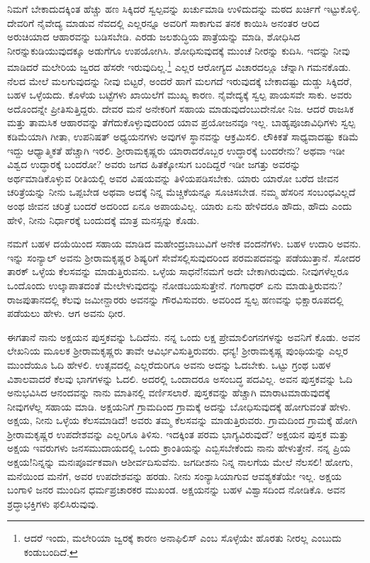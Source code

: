 ನಿಮಗೆ ಬೇಕಾದುದಕ್ಕಿಂತ ಹೆಚ್ಚು ಹಣ ಸಿಕ್ಕಿದರೆ ಸ್ವಲ್ಪವನ್ನು ಖರ್ಚುಮಾಡಿ ಉಳಿದುದನ್ನು ಮಠದ ಖರ್ಚಿಗೆ ಇಟ್ಟುಕೊಳ್ಳಿ. ದೇವರಿಗೆ ನೈವೇದ್ಯ ಮಾಡುವ ನೆವದಲ್ಲಿ ಎಲ್ಲರನ್ನೂ ಅವರಿಗೆ ಸಾಕಾಗುವ ತನಕ ಕಾಯಿಸಿ ಅನಂತರ ಆರಿದ ಅರುಚಿಯಾದ ಆಹಾರವನ್ನು ಬಡಿಸಬೇಡಿ. ಎರಡು ಜಲಶುದ್ಧಿಯ ಪಾತ್ರೆಯನ್ನು ಮಾಡಿ, ಶೋಧಿಸಿದ ನೀರನ್ನು\break ಕುಡಿಯುವುದಕ್ಕೂ ಅಡುಗೆಗೂ ಉಪಯೋಗಿಸಿ. ಶೋಧಿಸುವುದಕ್ಕೆ ಮುಂಚೆ ನೀರನ್ನು ಕುದಿಸಿ. ಇದನ್ನು ನೀವು ಮಾಡಿದರೆ ಮಲೇರಿಯ ಜ್ವರದ ಹೆಸರೇ ಇರುವುದಿಲ್ಲ.\footnote{ಆದರೆ ಇಂದು, ಮಲೇರಿಯಾ ಜ್ವರಕ್ಕೆ ಕಾರಣ ಅನಾಫಿಲಿಸ್ ಎಂಬ ಸೊಳ್ಳೆಯೇ ಹೊರತು ನೀರಲ್ಲ ಎಂಬುದು ಕಂಡುಬಂದಿದೆ.} ಎಲ್ಲರ ಆರೋಗ್ಯದ ವಿಚಾರದಲ್ಲೂ ಚೆನ್ನಾಗಿ ಗಮನಕೊಡು. ನೆಲದ ಮೇಲೆ ಮಲಗುವುದನ್ನು ನೀವು ಬಿಟ್ಟರೆ, ಅಂದರೆ ಹಾಗೆ ಮಲಗದೆ ಇರುವುದಕ್ಕೆ ಬೇಕಾದಷ್ಟು ದುಡ್ಡು ಸಿಕ್ಕಿದರೆ, ಬಹಳ ಒಳ್ಳೆಯದು. ಕೊಳೆಯ ಬಟ್ಟೆಗಳು ಖಾಯಿಲೆಗೆ ಮುಖ್ಯ ಕಾರಣ. ನೈವೇದ್ಯಕ್ಕೆ ಸ್ವಲ್ಪ ಪಾಯಸವೇ ಸಾಕು. ಅವರು ಅದೊಂದನ್ನೇ ಪ್ರೀತಿಸುತ್ತಿದ್ದರು. ದೇವರ ಮನೆ ಅನೇಕರಿಗೆ ಸಹಾಯ ಮಾಡುವುದೆಂಬುದೇನೋ ನಿಜ. ಆದರೆ ರಾಜಸಿಕ ಮತ್ತು ತಾಮಸಿಕ ಆಹಾರವನ್ನು ತೆಗೆದುಕೊಳ್ಳುವುದರಿಂದ ಯಾವ ಪ್ರಯೋಜನವೂ ಇಲ್ಲ. ಬಾಹ್ಯಪೂಜಾವಿಧಿಗಳು ಸ್ವಲ್ಪ ಕಡಿಮೆಯಾಗಿ ಗೀತಾ, ಉಪನಿಷತ್ ಅಧ್ಯಯನಗಳು ಅವುಗಳ ಸ್ಥಾನವನ್ನು ಆಕ್ರಮಿಸಲಿ. ಲೌಕಿಕತೆ ಸಾಧ್ಯವಾದಷ್ಟು ಕಡಿಮೆ ಇದ್ದು ಆಧ್ಯಾತ್ಮಿಕತೆ ಹೆಚ್ಚಾಗಿ ಇರಲಿ. ಶ‍್ರೀರಾಮಕೃಷ್ಣರು ಯಾರಾದರೊಬ್ಬರ ಉದ್ಧಾರಕ್ಕೆ ಬಂದರೇನು? ಅಥವಾ ಇಡೀ ವಿಶ್ವದ ಉದ್ಧಾರಕ್ಕೆ ಬಂದರೋ? ಅವರು ಜಗದ ಹಿತಕ್ಕೋಸುಗ ಬಂದಿದ್ದರೆ ಇಡೀ ಜಗತ್ತು ಅವರನ್ನು ಅರ್ಥಮಾಡಿಕೊಳ್ಳುವ ರೀತಿಯಲ್ಲಿ ಅವರ ವಿಷಯವನ್ನು ತಿಳಿಯಪಡಿಸಬೇಕು. ಯಾರು ಯಾರೋ ಬರೆದ ಜೀವನ ಚರಿತ್ರೆಯನ್ನು ನೀನು ಒಪ್ಪಬೇಡ ಅಥವಾ ಅದಕ್ಕೆ ನಿನ್ನ ಮೆಚ್ಚಿಕೆಯನ್ನೂ ಸೂಚಿಸಬೇಡ. ನಮ್ಮ ಹೆಸರಿನ ಸಂಬಂಧವಿಲ್ಲದೆ ಅಂಥ ಜೀವನ ಚರಿತ್ರೆ ಬಂದರೆ ಅದರಿಂದ ಏನೂ ಅಪಾಯವಿಲ್ಲ. ಯಾರು ಏನು ಹೇಳಿದರೂ ಹೌದು, ಹೌದು ಎಂದು ಹೇಳಿ, ನೀನು ನಿರ್ಧಾರಕ್ಕೆ ಬಂದುದಕ್ಕೆ ಮಾತ್ರ ಮನಸ್ಸನ್ನು ಕೊಡು.

ನಮಗೆ ಬಹಳ ದಯೆಯಿಂದ ಸಹಾಯ ಮಾಡಿದ ಮಹೇಂದ್ರಬಾಬುವಿಗೆ ಅನೇಕ ವಂದನೆಗಳು. ಬಹಳ ಉದಾರಿ ಅವನು. ಇನ್ನು ಸಂನ್ಯಾಲ್\enginline{-} ಅವನು ಶ‍್ರೀರಾಮಕೃಷ್ಣರ ಶಿಷ್ಯರಿಗೆ ಸೇವೆಸಲ್ಲಿಸುವುದರಿಂದ ಪರಮಪದವನ್ನು ಪಡೆಯುತ್ತಾನೆ. ಸೋದರ ತಾರಕ್ ಒಳ್ಳೆಯ ಕೆಲಸವನ್ನು ಮಾಡುತ್ತಿರುವನು. ಒಳ್ಳೆಯ ಸಾಧನೆ!ನಮಗೆ ಅದೇ ಬೇಕಾಗಿರುವುದು. ನೀವುಗಳೆಲ್ಲರೂ ಒಂದೊಂದು ಉಲ್ಕಾಪಾತದಂತೆ ಮೇಲೇಳುವುದನ್ನು ನೋಡಬಯಸುತ್ತೇನೆ. ಗಂಗಾಧರ್ ಏನು ಮಾಡುತ್ತಿರುವನು? ರಾಜಪುತಾನದಲ್ಲಿ ಕೆಲವು ಜಮೀನ್ದಾರರು ಅವನನ್ನು ಗೌರವಿಸುವರು. ಅವರಿಂದ ಸ್ವಲ್ಪ ಹಣವನ್ನು ಭಿಕ್ಷಾರೂಪದಲ್ಲಿ ಪಡೆಯಲು ಹೇಳು. ಆಗ ಅವನು ಧೀರ.

ಈಗತಾನೆ ನಾನು ಅಕ್ಷಯನ ಪುಸ್ತಕವನ್ನು ಓದಿದೆನು. ನನ್ನ ಒಂದು ಲಕ್ಷ ಪ್ರೇಮಾಲಿಂಗನಗಳನ್ನು ಅವನಿಗೆ ಕೊಡು. ಅವನ ಲೇಖನಿಯ ಮೂಲಕ ಶ‍್ರೀರಾಮಕೃಷ್ಣರು ತಾವೇ ಆವಿರ್ಭವಿಸುತ್ತಿರುವರು. ಧನ್ಯ! ಶ‍್ರೀರಾಮಕೃಷ್ಣ ಪುಂಥಿಯನ್ನು ಎಲ್ಲರ ಮುಂದೆಯೂ ಓದಿ ಹೇಳಲಿ. ಉತ್ಸವದಲ್ಲಿ ಎಲ್ಲರೆದುರಿಗೂ ಅವನು ಅದನ್ನು ಓದಬೇಕು. ಒಟ್ಟು ಗ್ರಂಥ ಬಹಳ ವಿಶಾಲವಾದರೆ ಕೆಲವು ಭಾಗಗಳನ್ನು ಓದಲಿ. ಅದರಲ್ಲಿ ಒಂದಾದರೂ ಅಸಂಬದ್ಧ ಪದವಿಲ್ಲ. ಅವನ ಪುಸ್ತಕವನ್ನು ಓದಿ ಅನುಭವಿಸಿದ ಆನಂದವನ್ನು ನಾನು ಮಾತಿನಲ್ಲಿ ವರ್ಣಿಸಲಾರೆ. ಪುಸ್ತಕವನ್ನು ಹೆಚ್ಚಾಗಿ ಮಾರಾಟಮಾಡುವುದಕ್ಕೆ ನೀವುಗಳೆಲ್ಲ ಸಹಾಯ ಮಾಡಿ. ಅಕ್ಷಯನಿಗೆ ಗ್ರಾಮದಿಂದ ಗ್ರಾಮಕ್ಕೆ ಅದನ್ನು ಬೋಧಿಸುವುದಕ್ಕೆ ಹೋಗುವಂತೆ ಹೇಳು. ಅಕ್ಷಯ, ನೀನು ಒಳ್ಳೆಯ ಕೆಲಸಮಾಡಿದೆ! \enginline{-} ಅವರು ತಮ್ಮ ಕೆಲಸವನ್ನು ಮಾಡುತ್ತಿರುವರು. ಗ್ರಾಮದಿಂದ ಗ್ರಾಮಕ್ಕೆ ಹೋಗಿ ಶ‍್ರೀರಾಮಕೃಷ್ಣರ ಉಪದೇಶವನ್ನು ಎಲ್ಲರಿಗೂ ತಿಳಿಸು. ಇದಕ್ಕಿಂತ ಪರಮ ಭಾಗ್ಯವಿರುವುದೆ? ಅಕ್ಷಯನ ಪುಸ್ತಕ ಮತ್ತು ಅಕ್ಷಯ ಇವರುಗಳು ಜನಸಮುದಾಯದಲ್ಲಿ ಒಂದು ಕ್ರಾಂತಿಯನ್ನು ಎಬ್ಬಿಸಬೇಕೆಂದು ನಾನು ಹೇಳುತ್ತೇನೆ. ನನ್ನ ಪ್ರಿಯ ಅಕ್ಷಯ!ನಿನ್ನನ್ನು ಮನಃಪೂರ್ವಕವಾಗಿ ಆಶೀರ್ವದಿಸುವೆನು. ಜಗದೀಶನು ನಿನ್ನ ನಾಲಗೆಯ ಮೇಲೆ ನೆಲಸಲಿ! ಹೋಗು, ಮನೆಯಿಂದ ಮನೆಗೆ, ಅವರ ಉಪದೇಶವನ್ನು ಹರಡು. ನೀನು ಸಂನ್ಯಾಸಿಯಾಗುವ ಆವಶ್ಯಕತೆಯೇ ಇಲ್ಲ. ಅಕ್ಷಯ ಬಂಗಾಳಿ ಜನರ ಮುಂದಿನ ಧರ್ಮಪ್ರಚಾರಕರ ಮುಖಂಡ. ಅಕ್ಷಯನನ್ನು ಬಹಳ ವಿಶ್ವಾಸದಿಂದ ನೋಡಿಕೊ. ಅವನ ಶ್ರದ್ಧಾಭಕ್ತಿಗಳು ಫಲಿಸಿರುವುವು.
\vspace{0.2cm}

